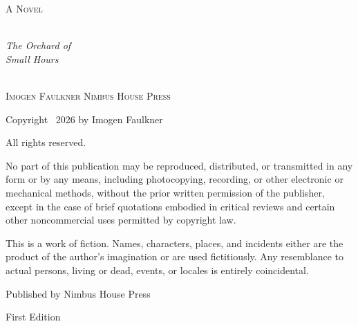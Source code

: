 \documentclass[10pt,twoside]{memoir}
\begin{document}
\frontmatter
\pagestyle{empty}

\begin{titlingpage}
\begin{center}
\vspace*{2.2cm}
{\normalfont\large\scshape\color{mutedGrey}A Novel}\\[2.3cm]
\\[1.6cm]
{\normalfont\HUGE\itshape\color{inkNavy}The Orchard of\\[4pt] Small Hours}\\[2cm]
\\[2cm]
{\normalfont\Large\scshape\color{inkNavy}Imogen Faulkner}
\vfill
{\normalfont\small\scshape\color{mutedGrey}Nimbus House Press}
\vspace*{1.2cm}
\end{center}
\end{titlingpage}

\clearpage
\vspace*{\fill}
\begin{center}
{\small
Copyright \textcopyright\ 2026 by Imogen Faulkner\par
\medskip
All rights reserved.\par
\medskip
No part of this publication may be reproduced, distributed, or transmitted in
any form or by any means, including photocopying, recording, or other
electronic or mechanical methods, without the prior written permission of the
publisher, except in the case of brief quotations embodied in critical
reviews and certain other noncommercial uses permitted by copyright law.\par
\medskip
This is a work of fiction. Names, characters, places, and incidents either
are the product of the author's imagination or are used fictitiously. Any
resemblance to actual persons, living or dead, events, or locales is entirely
coincidental.\par
\bigskip
Published by Nimbus House Press\par
First Edition
}
\end{center}
\vspace*{\fill}
\end{document}
